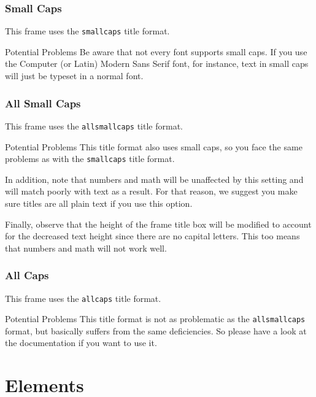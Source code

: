 \documentclass[10pt]{beamer}
\begin{document}
{
\begin{frame}
\frametitle{Small Caps}
  This frame uses the \texttt{smallcaps} title format.

  \begin{alertblock}{Potential Problems}
    Be aware that not every font supports small caps. If you use the Computer (or Latin) Modern Sans Serif font, for instance, text in small caps will just be typeset in a normal font.
  \end{alertblock}
\end{frame}
}

{
\begin{frame}
\frametitle{All Small Caps}
  This frame uses the \texttt{allsmallcaps} title format.

  \begin{alertblock}{Potential Problems}
    This title format also uses small caps, so you face the same problems as with the \texttt{smallcaps} title format.

    \medskip

    In addition, note that numbers and math will be unaffected by this setting and will match
    poorly with text as a result. For that reason, we suggest you make sure titles are all
    plain text if you use this option.

    \medskip

    Finally, observe that the height of the frame title box will be modified to account for the
    decreased text height since there are no capital letters. This too means that numbers and
    math will not work well.
  \end{alertblock}
\end{frame}
}

{
\begin{frame}
\frametitle{All Caps}
  This frame uses the \texttt{allcaps} title format.

  \begin{alertblock}{Potential Problems}
    This title format is not as problematic as the \texttt{allsmallcaps} format, but basically suffers from the same deficiencies. So please have a look at the documentation if you want to use it.
  \end{alertblock}
\end{frame}
}

\section{Elements}
\end{document}
